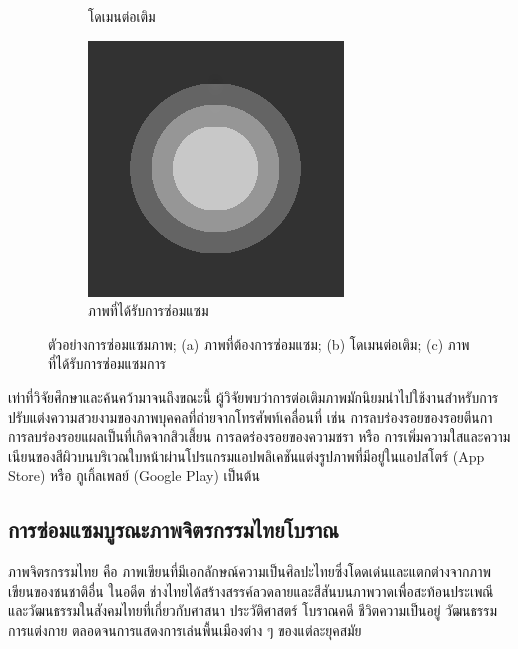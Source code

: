 \documentclass[hidelinks,a4paper]{article}
\numberwithin{equation}{section}							%
\begin{document}
{\begin{figure}[H]
\begin{subfigure}{0.3\linewidth}
			\caption{โดเมนต่อเติม}
		\end{subfigure}
		\begin{subfigure}{0.3\linewidth}
			\centering
			\includegraphics[width=0.8\linewidth]{images/grayscale_inpaint/result_splitbergman.png}
			\caption{ภาพที่ได้รับการซ่อมแซม}
		\end{subfigure}
		\caption{ตัวอย่างการซ่อมแซมภาพ; (a) ภาพที่ต้องการซ่อมแซม; (b) โดเมนต่อเติม; (c) ภาพที่ได้รับการซ่อมแซมการ}
		\label{fig1}
	\end{figure}
		 
		 \hspace{1cm} เท่าที่วิจัยศึกษาและค้นคว้ามาจนถึงขณะนี้ ผู้วิจัยพบว่าการต่อเติมภาพมักนิยมนำไปใช้งานสำหรับการปรับแต่งความสวยงามของภาพบุคคลที่ถ่ายจากโทรศัพท์เคลื่อนที่ เช่น การลบร่องรอยของรอยตีนกา การลบร่องรอยแผลเป็นที่เกิดจากสิวเสี้ยน การลดร่องรอยของความชรา หรือ การเพิ่มความใสและความเนียนของสีผิวบนบริเวณใบหน้าผ่านโปรแกรมแอปพลิเคชันแต่งรูปภาพที่มีอยู่ในแอปสโตร์ (App Store) หรือ กูเกิ้ลเพลย์ (Google Play) เป็นต้น 
		 
		 \subsection{การซ่อมแซมบูรณะภาพจิตรกรรมไทยโบราณ}
		 
		\hspace{1cm} ภาพจิตรกรรมไทย คือ ภาพเขียนที่มีเอกลักษณ์ความเป็นศิลปะไทยซึ่งโดดเด่นและแตกต่างจากภาพเขียนของชนชาติอื่น ในอดีต  ช่างไทยได้สร้างสรรค์ลวดลายและสีสันบนภาพวาดเพื่อสะท้อนประเพณีและวัฒนธรรมในสังคมไทยที่เกี่ยวกับศาสนา ประวัติศาสตร์ โบราณคดี ชีวิตความเป็นอยู่ วัฒนธรรมการแต่งกาย ตลอดจนการแสดงการเล่นพื้นเมืองต่าง ๆ ของแต่ละยุคสมัย 
		
}
\end{document}
